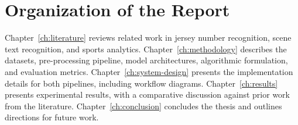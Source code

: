 \section{Organization of the Report}
\label{sec:organization}

Chapter~\ref{ch:literature} reviews related work in jersey number
recognition, scene text recognition, and sports analytics.
Chapter~\ref{ch:methodology} describes the datasets, pre-processing
pipeline, model architectures, algorithmic formulation, and evaluation
metrics. Chapter~\ref{ch:system-design} presents the implementation
details for both pipelines, including workflow diagrams.
Chapter~\ref{ch:results} presents experimental results, with a
comparative discussion against prior work from the literature.
Chapter~\ref{ch:conclusion} concludes the thesis and outlines
directions for future work.
